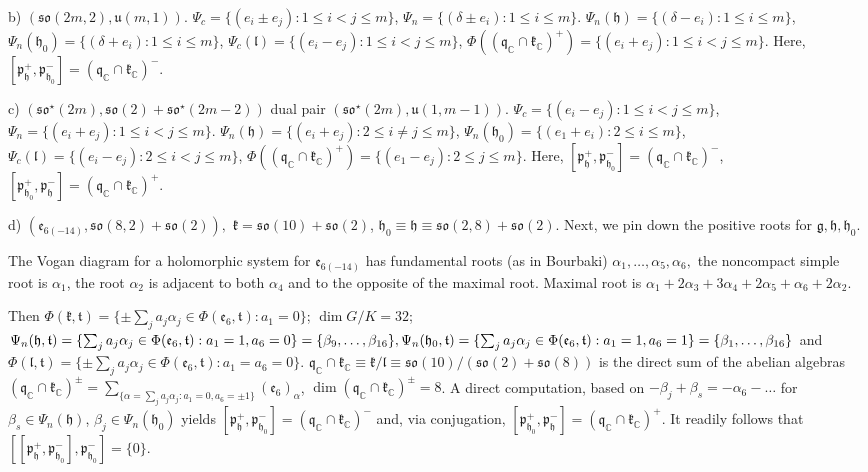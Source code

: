 \documentclass[12pt]{amsart}
\theoremstyle{definition}
\theoremstyle{remark}
\newcommand{\e}{\mathfrak{e}}
\newcommand{\g}{\mathfrak{g}}
\newcommand{\h}{\mathfrak{h}}
\renewcommand{\k}{{\mathfrak k}}
\renewcommand{\l}{\mathfrak l}
\newcommand{\p}{\mathfrak p}
\newcommand{\q}{\mathfrak q}
\renewcommand{\t}{{\mathfrak t}}
\newcommand{\C}{{\mathbb C}}
\numberwithin{equation}{section}
\begin{document}
b) $(\mathfrak{so}(2m,2), \mathfrak u(m,1))$. $\Psi_c=\{(e_i \pm e_j):  1 \leq i<j\leq m \}$, $\Psi_n=\{(\delta \pm e_i):  1 \leq i \leq m \}$. $\Psi_n(\h)=\{(\delta -e_i  ):  1 \leq i\leq m \}$, $\Psi_n(\h_0)=\{(\delta +e_i  ):  1 \leq i\leq m \}$, $\Psi_c(\l)=\{(e_i - e_j):  1 \leq i<j\leq m \}$, $\Phi((\q_\C \cap \k_\C)^+)= \{(e_i + e_j):  1 \leq i<j\leq m \}$. Here, $[\p_{\h}^+, \p_{\h_0}^-]=(\q_\C \cap \k_\C)^-$.

c) $(\mathfrak{so^\star}(2m), \mathfrak{so}(2)+ \mathfrak{so^\star}(2m-2))$ dual pair $(\mathfrak{so^\star}(2m),  \mathfrak u(1,m-1))$.
$\Psi_c=\{(e_i - e_j):  1 \leq i<j\leq m \}$, $\Psi_n=\{(e_i + e_j):  1 \leq i<j\leq m  \}$. $\Psi_n(\h)=\{(e_i +e_j  ): 2 \leq i\not= j \leq m \}$, $\Psi_n(\h_0)=\{(e_1 +e_i  ):  2 \leq i\leq m \}$, $\Psi_c(\l)=\{(e_i - e_j):  2 \leq i<j\leq m \}$, $\Phi((\q_\C \cap \k_\C)^+)= \{(e_1 - e_j):  2\leq  j\leq m \}$. Here, $[\p_{\h}^+, \p_{\h_0}^-]=(\q_\C \cap \k_\C)^-$, $[\p_{\h_0}^+, \p_{\h}^-]=(\q_\C \cap \k_\C)^+$.

d) $(\mathfrak e_{6(-14)}, \mathfrak{so}(8,2)+\mathfrak {so}(2)), $
    $\k =\mathfrak {so}(10)    +\mathfrak {so}(2)$, $  \h_0 \equiv \h\equiv \mathfrak {so}(2,8) +\mathfrak {so}(2)$. Next, we pin down the positive roots for $\g, \h, \h_0$.

  The Vogan diagram for a holomorphic system for $\mathfrak e_{6(-14)}$ has fundamental roots (as in Bourbaki) $\alpha_1, \dots, \alpha_5, \alpha_6, $  the noncompact simple root is $\alpha_1$, the root $\alpha_2$ is  adjacent to both $\alpha_4$ and to the opposite of the maximal root. Maximal root is $\alpha_1 +2\alpha_3 +3 \alpha_4+2 \alpha_5+\alpha_6 +2\alpha_2$.



\noindent
 Then $\Phi(\k,\t)= \{\pm \sum_j a_j \alpha_j \in \Phi(\mathfrak e_6,\mathfrak t) :    a_1=0\}$; $\dim G/K= 32$; $\Psi_n(\h ,\t)=\{  \sum_j a_j \alpha_j \in \Phi(\mathfrak e_6,\mathfrak t) :  a_1=1, a_6=0\}=\{\beta_9,\dots, \beta_{16} \}, \\ \Psi_n(\h_0,  \t)=\{  \sum_j a_j \alpha_j \in \Phi(\mathfrak e_6,\mathfrak t) :  a_1=1, a_6=1\}=\{\beta_1, \dots, \beta_{16} \}$ and $\Phi(\l, \t)=\{ \pm \sum_j a_j \alpha_j \in \Phi(\mathfrak e_6,\mathfrak t) :  a_1=a_6=0\}.$ $\q_\C \cap \k_\C \equiv \k/\l \equiv \mathfrak {so}(10)/ (\mathfrak{so}(2)+ \mathfrak {so}(8))$ is the direct  sum of the abelian algebras $(\q_\C \cap \k_\C)^\pm =\sum_{\{ \alpha =\sum_j a_j \alpha_j  : a_1=0, a_6=\pm 1\}} (\e_6)_\alpha$, $\dim (\q_\C \cap \k_\C)^\pm =8 $. A direct computation, based on $-\beta_j +\beta_s =-\alpha_6 -\dots$ for  $\beta_s \in \Psi_n(\h)$, $\beta_j \in \Psi_n(\h_0)$   yields $[\p_\h^+ , \p_{\h_0}^-] = (\q_\C \cap \k_\C)^-$ and, via conjugation,  $[\p_{\h_0}^+ , \p_{\h}^-] = (\q_\C \cap \k_\C)^+$. It readily follows that
$[[\p_\h^+ , \p_{\h_0}^-], \p_{\h_0}^-]=\{0\}$.
\end{document}
